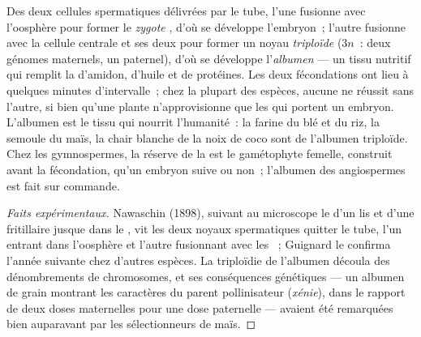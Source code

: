 \begin{proposition}\label{prop:b2:angiosperm-reproduction:double}
Des deux cellules spermatiques délivrées par le tube, l'une fusionne
avec l'oosphère pour former le \emph{zygote} , d'où se
développe l'embryon~; l'autre fusionne avec la cellule centrale et ses
deux  pour former un noyau \emph{triploïde} ($3n$~: deux
génomes maternels, un paternel), d'où se développe l'\emph{albumen}
--- un tissu nutritif qui remplit la  d'amidon, d'huile et de
protéines. Les deux fécondations ont lieu à quelques minutes
d'intervalle~; chez la plupart des espèces, aucune ne réussit sans
l'autre, si bien qu'une plante n'approvisionne que les  qui
portent un embryon. L'albumen est le tissu qui nourrit l'humanité~: la
farine du blé et du riz, la semoule du maïs, la chair blanche de la noix
de coco sont de l'albumen triploïde. Chez les gymnospermes, la réserve
de la  est le gamétophyte femelle, construit avant la fécondation,
qu'un embryon suive ou non~; l'albumen des angiospermes est fait sur
commande.
\end{proposition}
\begin{proof}[Faits expérimentaux]
Nawaschin (1898), suivant au microscope le  d'un lis et
d'une fritillaire jusque dans le , vit les deux noyaux
spermatiques quitter le tube, l'un entrant dans l'oosphère et l'autre
fusionnant avec les ~; Guignard le confirma l'année
suivante chez d'autres espèces. La triploïdie de l'albumen découla des
dénombrements de chromosomes, et ses conséquences génétiques --- un
albumen de grain montrant les caractères du parent pollinisateur
(\emph{xénie}), dans le rapport de deux doses maternelles pour une dose
paternelle --- avaient été remarquées bien auparavant par les
sélectionneurs de maïs.
\end{proof}

